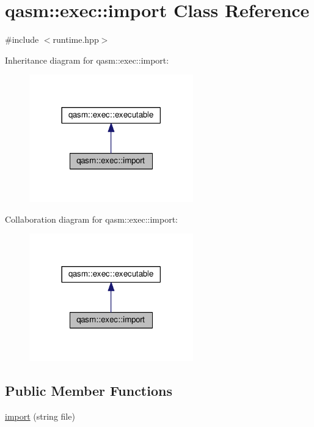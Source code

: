 \hypertarget{classqasm_1_1exec_1_1import}{}\section{qasm\+:\+:exec\+:\+:import Class Reference}
\label{classqasm_1_1exec_1_1import}


{\ttfamily \#include $<$runtime.\+hpp$>$}



Inheritance diagram for qasm\+:\+:exec\+:\+:import\+:\nopagebreak
\begin{figure}[H]
\begin{center}
\leavevmode
\includegraphics[width=201pt]{classqasm_1_1exec_1_1import__inherit__graph}
\end{center}
\end{figure}


Collaboration diagram for qasm\+:\+:exec\+:\+:import\+:\nopagebreak
\begin{figure}[H]
\begin{center}
\leavevmode
\includegraphics[width=201pt]{classqasm_1_1exec_1_1import__coll__graph}
\end{center}
\end{figure}
\subsection*{Public Member Functions}
\begin{DoxyCompactItemize}
\item 
\hyperlink{classqasm_1_1exec_1_1import_a95ac5a6910c5820c41314dc4de5dd98a}{import} (string file)
\end{DoxyCompactItemize}
